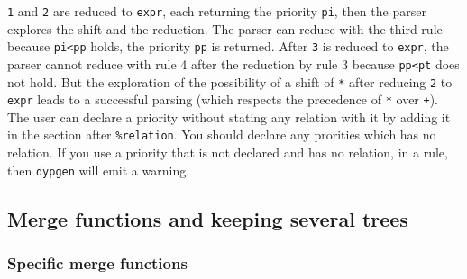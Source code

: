 \documentclass[12pt]{article}
\newcommand{\comment}[1]{}
\begin{document}
{\texttt{1} and \texttt{2} are reduced to \texttt{expr}, each returning the priority \texttt{pi}, then the parser explores the shift and the reduction.
The parser can reduce with the third rule because \texttt{pi<pp} holds, the priority \texttt{pp} is returned. After \texttt{3} is reduced to \texttt{expr}, the parser cannot reduce with rule 4 after the reduction by rule 3 because \texttt{pp<pt} does not hold.
But the exploration of the possibility of a shift of \texttt{*} after reducing \texttt{2} to \texttt{expr} leads to a successful parsing (which respects the precedence of \texttt{*} over \texttt{+}).\\

The user can declare a priority without stating any relation with it by adding it in the section after \texttt{\%relation}. You should declare any prorities which has no relation. If you use a priority that is not declared and has no relation, in a rule, then \texttt{dypgen} will emit a warning.\\

\comment{When a priority is declared a corresponding Caml value of type \texttt{priority} is introduced with the same name. You should beware of identifier collision and not name other variables with the names of your priorities or \texttt{default\_priority}. This value can be used in action codes. All the information about relations are stored in a structure of type \texttt{priority\_data}. This structure is accessible from the action code with the record field \texttt{dyp.priority\_data}. The following function allows to know whether the relation holds between two priorities:
\begin{verbatim}
val is_relation: priority_data -> priority -> priority -> bool
\end{verbatim}
\texttt{is\_relation dyp.priority\_data p q} returns true if \texttt{p<q} holds and false otherwise. The type of the record \verb|dyp| is defined in the module \verb|Dyp| of the library \verb|dyp.cm[x]a|, see the section \ref{dyp} for more information about it. Other functions pertaining to priorities are available, see section \ref{dynamic priority} about changing the priorities at runtime.}

\subsection{Merge functions and keeping several trees}\label{merge}

\subsubsection{Specific merge functions}

}
\end{document}
